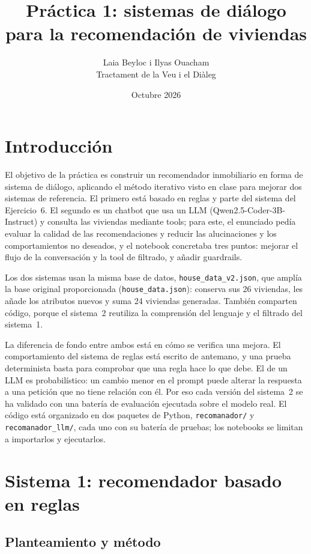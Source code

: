 \documentclass[10pt,a4paper]{article}
\title{Práctica 1: sistemas de diálogo para la recomendación de viviendas}
\author{Laia Beyloc i Ilyas Ouacham\\[2pt]\small Tractament de la Veu i el Diàleg}
\date{Octubre 2026}
\begin{document}
\maketitle

\section{Introducción}

El objetivo de la práctica es construir un recomendador inmobiliario en forma de sistema de diálogo, aplicando el método iterativo visto en clase para mejorar dos sistemas de referencia. El primero está basado en reglas y parte del sistema del Ejercicio~6. El segundo es un chatbot que usa un LLM (Qwen2.5-Coder-3B-Instruct) y consulta las viviendas mediante tools; para este, el enunciado pedía evaluar la calidad de las recomendaciones y reducir las alucinaciones y los comportamientos no deseados, y el notebook concretaba tres puntos: mejorar el flujo de la conversación y la tool de filtrado, y añadir guardrails.

Los dos sistemas usan la misma base de datos, \texttt{house\_data\_v2.json}, que amplía la base original proporcionada (\texttt{house\_data.json}): conserva sus 26 viviendas, les añade los atributos nuevos y suma 24 viviendas generadas. También comparten código, porque el sistema~2 reutiliza la comprensión del lenguaje y el filtrado del sistema~1.

La diferencia de fondo entre ambos está en cómo se verifica una mejora. El comportamiento del sistema de reglas está escrito de antemano, y una prueba determinista basta para comprobar que una regla hace lo que debe. El de un LLM es probabilístico: un cambio menor en el prompt puede alterar la respuesta a una petición que no tiene relación con él. Por eso cada versión del sistema~2 se ha validado con una batería de evaluación ejecutada sobre el modelo real. El código está organizado en dos paquetes de Python, \texttt{recomanador/} y \texttt{recomanador\_llm/}, cada uno con su batería de pruebas; los notebooks se limitan a importarlos y ejecutarlos.

\section{Sistema 1: recomendador basado en reglas}

\subsection{Planteamiento y método}
\end{document}
